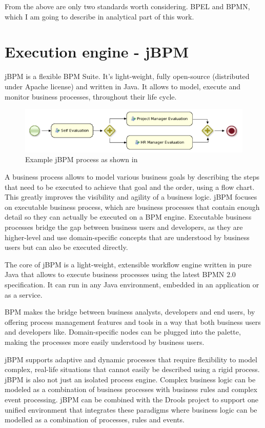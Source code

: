 	From the above are only two standards worth considering. BPEL and BPMN, which I am going to describe in analytical part
	of this work.

	\section{Execution engine - jBPM}
	
	\cite{jbpm}
	jBPM is a flexible \gls{BPM} Suite. It's light-weight, fully open-source (distributed under
	Apache license) and written in Java. It allows to model, execute and monitor business processes, throughout their life
	cycle.
	
	\begin{figure}[h]
	  	\centering
	    \includegraphics[width=12cm]{figures/jbpm_process.png}
	  	\caption{Example jBPM process as shown in \cite{jbpm}}
	\end{figure}
	
	A business process allows to model various business goals by describing the steps that need to be executed to achieve
	that goal and the order, using a flow chart. This greatly improves the visibility and agility of a business logic.
	jBPM focuses on executable business process, which are business processes that contain enough detail so they can
	actually be executed on a BPM engine. Executable business processes bridge the gap between business users and
	developers, as they are higher-level and use domain-specific concepts that are understood by business users but can
	also be executed directly.

	The core of jBPM is a light-weight, extensible workflow engine written in pure Java that allows to execute business
	processes using the latest \gls{BPMN} 2.0 specification. It can run in any Java environment, embedded in an application
	or as a service.

	BPM makes the bridge between business analysts, developers and end users, by offering process management features and
	tools in a way that both business users and developers like. Domain-specific nodes can be plugged into the palette,
	making the processes more easily understood by business users.

	jBPM supports adaptive and dynamic processes that require flexibility to model complex, real-life situations that
	cannot easily be described using a rigid process. jBPM is also not just an isolated process engine. Complex business
	logic can be modeled as a combination of business processes with business rules and complex event processing. jBPM can
	be combined with the Drools project to support one unified environment that integrates these paradigms where business
	logic can be modelled as a combination of processes, rules and events.

